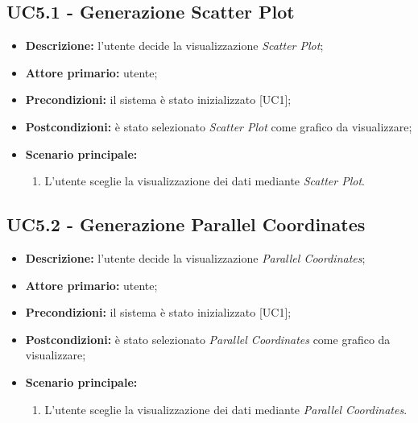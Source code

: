 \subsection{UC5.1 - Generazione Scatter Plot}
\begin{itemize}
    \item \textbf{Descrizione:} l'utente decide la visualizzazione \textit{Scatter Plot};
    \item \textbf{Attore primario:} utente;
    \item \textbf{Precondizioni:} il sistema è stato inizializzato [UC1];
    \item \textbf{Postcondizioni:} è stato selezionato \textit{Scatter Plot} come grafico da visualizzare;
    \item \textbf{Scenario principale:}
    \begin{enumerate}
      \item L'utente sceglie la visualizzazione dei dati mediante \textit{Scatter Plot}.
    \end{enumerate}
\end{itemize}

\subsection{UC5.2 - Generazione Parallel Coordinates}
\begin{itemize}
    \item \textbf{Descrizione:} l'utente decide la visualizzazione \textit{Parallel Coordinates};
    \item \textbf{Attore primario:} utente;
    \item \textbf{Precondizioni:} il sistema è stato inizializzato [UC1];
    \item \textbf{Postcondizioni:} è stato selezionato \textit{Parallel Coordinates} come grafico da visualizzare;
    \item \textbf{Scenario principale:}
    \begin{enumerate}
    \item L'utente sceglie la visualizzazione dei dati mediante \textit{Parallel Coordinates}.
    \end{enumerate}
\end{itemize}

